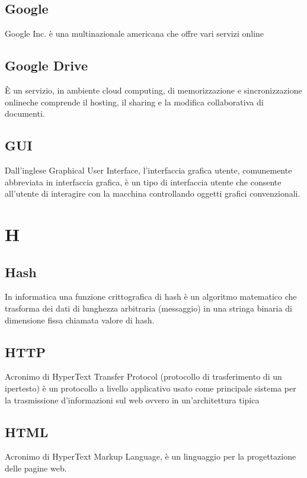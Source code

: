 {{		\subsection{Google}
		Google Inc. è una multinazionale americana che offre vari servizi online


		\subsection{Google Drive}
		È un servizio, in ambiente cloud computing, di memorizzazione e sincronizzazione onlineche comprende il  hosting, il  sharing e la modifica collaborativa di documenti.


		\subsection{GUI}
		Dall'inglese Graphical User Interface, l'interfaccia grafica utente, comunemente abbreviata in interfaccia grafica, è un tipo di interfaccia utente che consente all'utente di interagire con la macchina controllando oggetti grafici convenzionali.

\section{H}
		\subsection{Hash}
		In informatica una funzione crittografica di hash è un algoritmo matematico che trasforma dei dati di lunghezza arbitraria (messaggio) in una stringa binaria di dimensione fissa chiamata valore di hash.


\subsection{HTTP}
Acronimo di HyperText Transfer Protocol (protocollo di trasferimento di un ipertesto) è un protocollo a livello applicativo usato come principale sistema per la trasmissione d'informazioni sul web ovvero in un'architettura tipica 


 \subsection{HTML}
Acronimo di HyperText Markup Language, è un linguaggio per la progettazione delle pagine web.

}}
